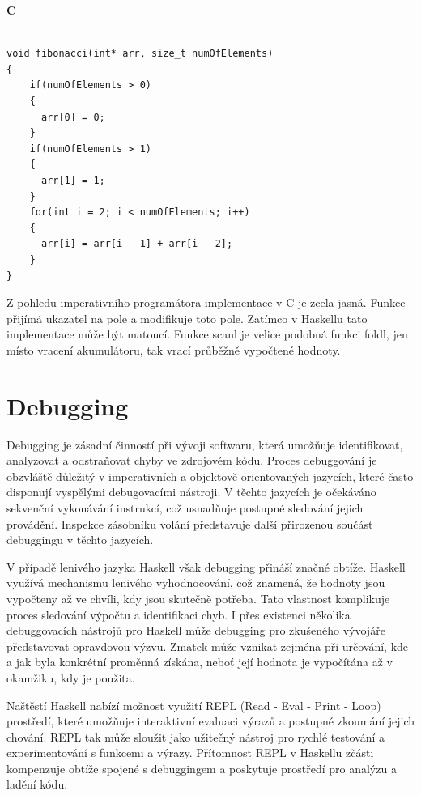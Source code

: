\documentclass[male,czech]{kithesis}
\begin{document}

\textbf{C}
\begin{verbatim}

void fibonacci(int* arr, size_t numOfElements)
{
    if(numOfElements > 0)
    {
      arr[0] = 0;
    }
    if(numOfElements > 1)
    {
      arr[1] = 1;
    }
    for(int i = 2; i < numOfElements; i++)
    {
      arr[i] = arr[i - 1] + arr[i - 2];
    }
}

\end{verbatim}

Z pohledu imperativního programátora implementace v C je zcela jasná. Funkce přijímá ukazatel na
pole a modifikuje toto pole. Zatímco v Haskellu tato implementace může být matoucí. Funkce scanl je 
velice podobná funkci foldl, jen místo vracení akumulátoru, tak vrací průběžně vypočtené hodnoty.

\section{Debugging}

Debugging je zásadní činností při vývoji softwaru, která umožňuje identifikovat, 
analyzovat a odstraňovat chyby ve zdrojovém kódu. 
Proces debuggování je obzvláště důležitý v imperativních a objektově orientovaných jazycích, 
které často disponují vyspělými debugovacími nástroji. 
V těchto jazycích je očekáváno sekvenční vykonávání instrukcí, 
což usnadňuje postupné sledování jejich provádění. 
Inspekce zásobníku volání představuje 
další přirozenou součást debuggingu v těchto jazycích.

V případě lenivého jazyka Haskell však debugging přináší značné obtíže. 
Haskell využívá mechanismu lenivého vyhodnocování, což znamená, 
že hodnoty jsou vypočteny až ve chvíli, kdy jsou skutečně potřeba. 
Tato vlastnost komplikuje proces sledování výpočtu a identifikaci chyb. 
I přes existenci několika debuggovacích nástrojů pro Haskell může 
debugging pro zkušeného vývojáře představovat opravdovou výzvu. 
Zmatek může vznikat zejména při určování, 
kde a jak byla konkrétní proměnná získána, 
neboť její hodnota je vypočítána až v okamžiku, 
kdy je použita.

Naštěstí Haskell nabízí možnost využití REPL 
(Read - Eval - Print - Loop) prostředí, 
které umožňuje interaktivní evaluaci výrazů a postupné zkoumání jejich chování. 
REPL tak může sloužit jako užitečný nástroj pro rychlé testování 
a experimentování s funkcemi a výrazy. 
Přítomnost REPL v Haskellu zčásti kompenzuje obtíže spojené 
s debuggingem a poskytuje prostředí pro analýzu a ladění kódu.
\end{document}
